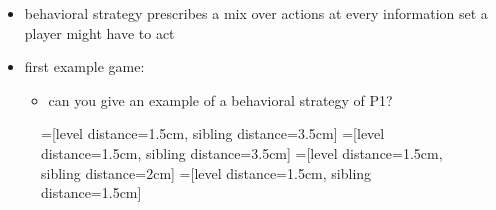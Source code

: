 \documentclass{beamer}    %
\theoremstyle{plain}
\theoremstyle{definition}
\begin{document}
{\begin{itemize}
\item behavioral strategy prescribes a mix over actions at every information set a player might have to act
\framebreak
\item first example game:
  \begin{itemize}
  \item can you give an example of a behavioral strategy of P1?%
  \end{itemize}
\end{itemize}
 \begin{figure}[h]
\centering
=[level distance=1.5cm, sibling distance=3.5cm]
=[level distance=1.5cm, sibling distance=3.5cm]
=[level distance=1.5cm, sibling distance=2cm]
=[level distance=1.5cm, sibling distance=1.5cm]
\end{figure}}
\end{document}
